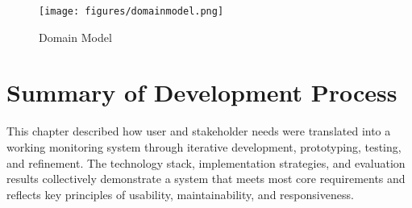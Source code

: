 \begin{figure}[H]
        \centering
        \texttt{[image: figures/domainmodel.png]}
        \caption{Domain Model}
        \label{sfig:domain_model}
\end{figure}


\section{Summary of Development Process} 
This chapter described how user and stakeholder needs were translated into a working monitoring system through iterative development, prototyping, testing, and refinement. The technology stack, implementation strategies, and evaluation results collectively demonstrate a system that meets most core requirements and reflects key principles of usability, maintainability, and responsiveness.